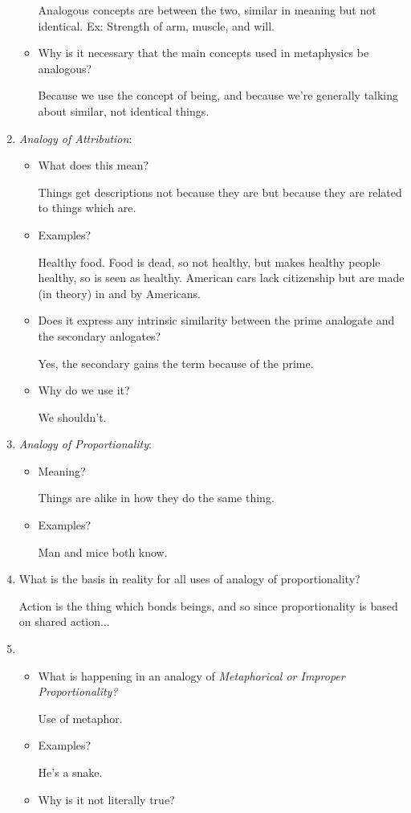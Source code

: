 \documentclass[12pt]{article}[titlepage]
\newcommand{\1}{\={a}}
\newcommand{\2}{\={e}}
\newcommand{\3}{\={\i}}
\newcommand{\4}{\=o}
\newcommand{\5}{\=u}
\newcommand{\6}{\={A}}
\renewcommand{\,}{\textsuperscript{,}}
\begin{document}
\begin{enumerate}
\begin{itemize}
Analogous concepts are between the two, similar in meaning but not identical.
Ex: Strength of arm, muscle, and will.
\item Why is it necessary that the main concepts used in metaphysics be analogous?

Because we use the concept of being, and because we're generally talking about similar, not identical things.
\end{itemize}
\item \emph{Analogy of Attribution}:
\begin{itemize}
\item What does this mean?

Things get descriptions not because they are but because they are related to things which are.
\item Examples?

Healthy food.
Food is dead, so not healthy, but makes healthy people healthy, so is seen as healthy.
American cars lack citizenship but are made (in theory) in and by Americans.
\item Does it express any intrinsic similarity between the prime analogate and the secondary anlogates?

Yes, the secondary gains the term because of the prime.
\item Why do we use it?

We shouldn't.
\end{itemize}
\item \emph{Analogy of Proportionality}:
\begin{itemize}
\item Meaning?

Things are alike in how they do the same thing.
\item Examples?

Man and mice both know.
\end{itemize}
\item What is the basis in reality for all uses of analogy of proportionality?

Action is the thing which bonds beings, and so since proportionality is based on shared action...
\item \begin{itemize}
\item What is happening in an analogy of \emph{Metaphorical or Improper Proportionality?}

Use of metaphor.
\item Examples?

He's a snake.
\item Why is it not literally true?


\end{itemize}
\end{enumerate}
\end{document}
